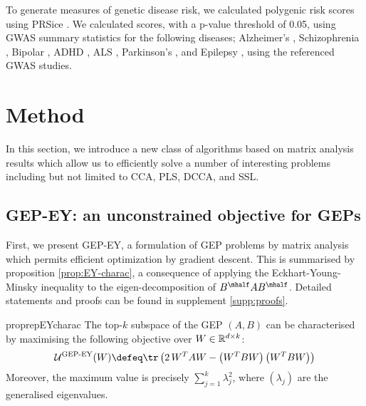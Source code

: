 To generate measures of genetic disease risk, we calculated polygenic risk scores using PRSice \cite{PRSice2014}. We calculated scores, with a p-value threshold of 0.05, using GWAS summary statistics for the following diseases; Alzheimer's \cite{Lambert2013}, Schizophrenia \cite{Trubetskoy2022}, Bipolar \cite{Mullins2021}, ADHD \cite{Demontis2023}, ALS \cite{Van_Rheenen2021}, Parkinson's \cite{Nalls2019}, and Epilepsy \cite{International_League_Against_Epilepsy_Consortium_on_Complex_Epilepsies2018}, using the referenced GWAS studies.


\section{Method}

In this section, we introduce a new class of algorithms based on matrix analysis results which allow us to efficiently solve a number of interesting problems including but not limited to CCA, PLS, DCCA, and SSL.

\subsection{GEP-EY: an unconstrained objective for GEPs}

First, we present GEP-EY, a formulation of GEP problems by matrix analysis which permits efficient optimization by gradient descent. 
This is summarised by proposition \ref{prop:EY-charac}, a consequence of applying the Eckhart-Young-Minsky inequality \cite{stewart_matrix_1990} to the eigen-decomposition of $B^\mhalf A B^\mhalf$. Detailed statements and proofs can be found in supplement \ref{supp:proofs}.

\begin{restatable}{proprep}{EYcharac}
\label{prop:EY-charac}
    The top-$k$ subspace of the GEP $(A,B)$ can be characterised by maximising the following objective over $W \in \mathbb{R}^{d \times k}$:
    \begin{align}
        \mathcal{U}^\text{GEP-EY}(W) \defeq \tr \left( 2\, W^T A W - \left(W^T B W\right) \left(W^T B W\right) \right)
    \end{align}
    Moreover, the maximum value is precisely $\sum_{j=1}^k \lambda_j^2$, where $(\lambda_j)$ are the generalised eigenvalues.
\end{restatable}

